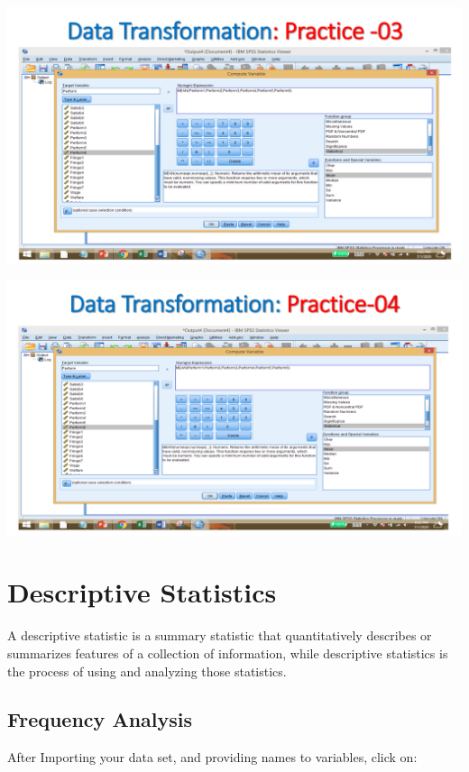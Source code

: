 \documentclass[
  letterpaper,
  DIV=11,
  numbers=noendperiod]{scrreprt}
\begin{document}
\includegraphics{images/slides/img_Page_022.png}

\includegraphics{images/slides/img_Page_023.png}


\chapter{Descriptive Statistics}\label{descriptive-statistics}

A descriptive statistic is a summary statistic that quantitatively
describes or summarizes features of a collection of information, while
descriptive statistics is the process of using and analyzing those
statistics.\\

\section{Frequency Analysis}\label{frequency-analysis}

After Importing your data set, and providing names to variables, click
on:\\
\end{document}
